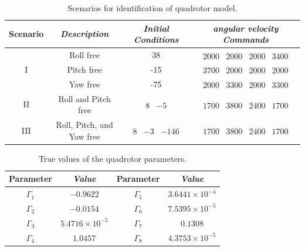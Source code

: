 \documentclass[3p,times]{elsarticle}
\begin{document}
\begin{table}[H]
	\renewcommand{\arraystretch}{1.3}
	\caption{Scenarios for identification of quadrotor model.}
	\begin{center}
	\begin{tabular}{c c c c}
	\hline
	\textbf{Scenario} & \textbf{\textit{Description}}& \textbf{\textit{Initial Conditions}} & \textbf{\textit{angular velocity Commands}}  \\
	\hline
	\multirow{3}{*}{I} & Roll free & 38 & $\begin{matrix}
		2000 & 2000 & 2000 & 3400
	\end{matrix}$ \\
	& Pitch free & -15 & $\begin{matrix}
		3700 & 2000 & 2000 & 2000
	\end{matrix}$ \\
	& Yaw free & -75 & $\begin{matrix}
		2000 & 3300 & 2000 & 3300
	\end{matrix}$ \\
	\hline
	II & Roll and Pitch free & $\begin{matrix}
		8 & -5
	\end{matrix}$ & $\begin{matrix}
		1700 & 3800 & 2400 & 1700
	\end{matrix}$\\
	\hline
	III & Roll, Pitch, and Yaw free & $\begin{matrix}
		8 & -3 & -146
	\end{matrix}$ & $\begin{matrix}
		1700 & 3800 & 2400 & 1700
	\end{matrix}$\\
	\hline
	\end{tabular}
	\label{tab:identification}
	\end{center}
\end{table}

\begin{table}[H]
	\renewcommand{\arraystretch}{1.3}
	\caption{True values of the quadrotor parameters.}
	\begin{center}
	\begin{tabular}{c c c c}
	\hline
	\textbf{Parameter} & \textbf{\textit{Value}}& \textbf{Parameter} & \textbf{\textit{Value}}  \\
	\hline
	$\Gamma_1$ & $-0.9622$ & $\Gamma_5$ & $3.6441\times10^{-4}$ \\

	$\Gamma_2$ & $-0.0154$ & $\Gamma_6$ & $7.5395\times10^{-5}$ \\

	$\Gamma_3$ &$5.4716\times10^{-5}$ & $\Gamma_7$ & $0.1308$ \\

	$\Gamma_4$ & $1.0457$ & $\Gamma_8$ & $4.3753\times10^{-5}$ \\
	\hline
	\end{tabular}
	\label{tab:true_parameters}
	\end{center}
\end{table}
\end{document}
